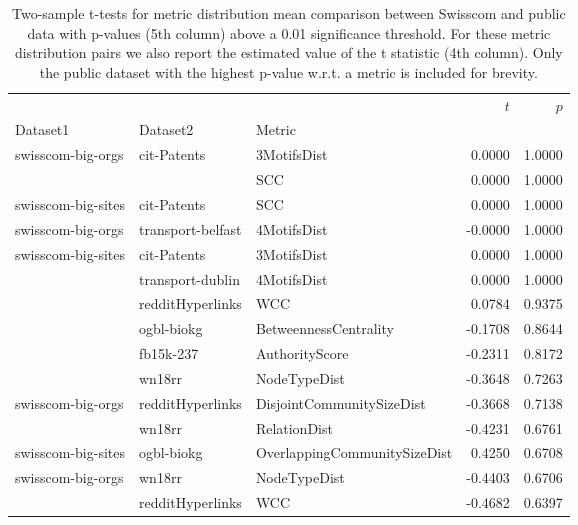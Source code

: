 \begin{table}[H]
    \centering
    \caption[Two-sample t-tests for metric distribution mean comparison between Swisscom and public data.]{Two-sample t-tests for metric distribution mean comparison between Swisscom and public data with p-values (5th column) above a 0.01 significance threshold. For these metric distribution pairs we also report the estimated value of the t statistic (4th column). Only the public dataset with the highest p-value w.r.t. a metric is included for brevity.}
    \label{tab:t}
\begin{adjustbox}{width=0.75\columnwidth}
\begin{tabular}{lllrr}
\toprule
                   &                   &          &   $t$ &  $p$ \\
Dataset1 & Dataset2 & Metric &         &              \\
\midrule
swisscom-big-orgs & cit-Patents & 3MotifsDist &  0.0000 &       1.0000 \\
                   &                   & SCC &  0.0000 &       1.0000 \\
swisscom-big-sites & cit-Patents & SCC &  0.0000 &       1.0000 \\
swisscom-big-orgs & transport-belfast & 4MotifsDist & -0.0000 &       1.0000 \\
swisscom-big-sites & cit-Patents & 3MotifsDist &  0.0000 &       1.0000 \\
                   & transport-dublin & 4MotifsDist &  0.0000 &       1.0000 \\
                   & redditHyperlinks & WCC &  0.0784 &       0.9375 \\
                   & ogbl-biokg & BetweennessCentrality & -0.1708 &       0.8644 \\
                   & fb15k-237 & AuthorityScore & -0.2311 &       0.8172 \\
                   & wn18rr & NodeTypeDist & -0.3648 &       0.7263 \\
swisscom-big-orgs & redditHyperlinks & DisjointCommunitySizeDist & -0.3668 &       0.7138 \\
                   & wn18rr & RelationDist & -0.4231 &       0.6761 \\
swisscom-big-sites & ogbl-biokg & OverlappingCommunitySizeDist &  0.4250 &       0.6708 \\
swisscom-big-orgs & wn18rr & NodeTypeDist & -0.4403 &       0.6706 \\
                   & redditHyperlinks & WCC & -0.4682 &       0.6397 \\

\end{tabular}
\end{adjustbox}
\end{table}
